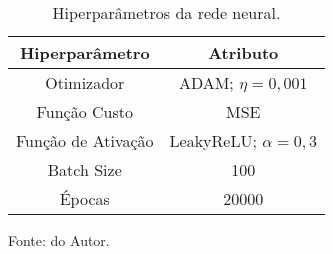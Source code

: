 



\begin{table}[H]
    \centering
    \caption{Hiperparâmetros da rede neural.}
\begin{tabular}{cc}
\hline
Hiperparâmetro     & Atributo                  \\ \hline
Otimizador         & ADAM; $\eta = 0,001$      \\
Função Custo       & MSE                       \\
Função de Ativação & LeakyReLU; $\alpha = 0,3$ \\
Batch Size         & 100                       \\
Épocas             & 20000                     \\ \hline
\end{tabular}

    \label{tab: Hiperparametros}

    \vspace{2.5mm}
    Fonte: do Autor.

\end{table}